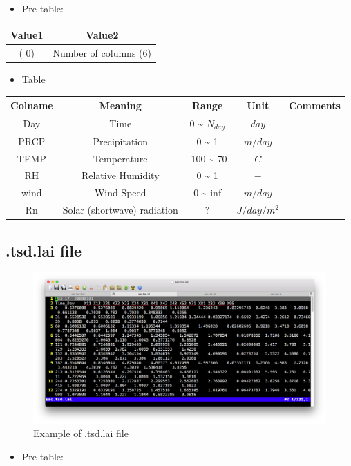 \documentclass[]{scrbook}
\providecommand{\tightlist}{%
  \setlength{\itemsep}{0pt}\setlength{\parskip}{0pt}}
\begin{document}
\begin{itemize}
\tightlist
\item
  Pre-table:
\end{itemize}

\begin{longtable}[]{@{}cc@{}}
\toprule
Value1 & Value2\tabularnewline
\midrule
\endhead
( \(0\)) & Number of columns (\(6\))\tabularnewline
\bottomrule
\end{longtable}

\begin{itemize}
\tightlist
\item
  Table
\end{itemize}

\begin{longtable}[]{@{}ccccc@{}}
\toprule
Colname & Meaning & Range & Unit & Comments\tabularnewline
\midrule
\endhead
Day & Time & 0 \textasciitilde{} \(N_{day}\) & \(day\) &\tabularnewline
PRCP & Precipitation & 0 \textasciitilde{} 1 & \(m/day\)
&\tabularnewline
TEMP & Temperature & -100 \textasciitilde{} 70 & \(C\) &\tabularnewline
RH & Relative Humidity & 0 \textasciitilde{} 1 & \(-\) &\tabularnewline
wind & Wind Speed & 0 \textasciitilde{} inf & \(m/day\) &\tabularnewline
Rn & Solar (shortwave) radiation & ? & \(J/day/m^2\) &\tabularnewline
\bottomrule
\end{longtable}

\subsection{.tsd.lai file}\label{tsd.lai-file}

\begin{figure}
\centering
\includegraphics{Fig/IO/tsd.lai.png}
\caption{Example of .tsd.lai file}
\end{figure}

\begin{itemize}
\tightlist
\item
  Pre-table:
\end{itemize}
\end{document}

